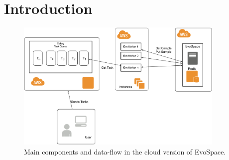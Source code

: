 \documentclass{llncs}
\begin{document}
\begin{abstract}




\end{abstract}
\section{Introduction}

\begin{figure}[t]
    \centering
        \includegraphics[width=10cm]{img/EvoSpaceAWS.png}
    \caption{Main components and data-flow in the cloud version of EvoSpace. }
    \label{fig:evospace}
\end{figure}
\end{document}
